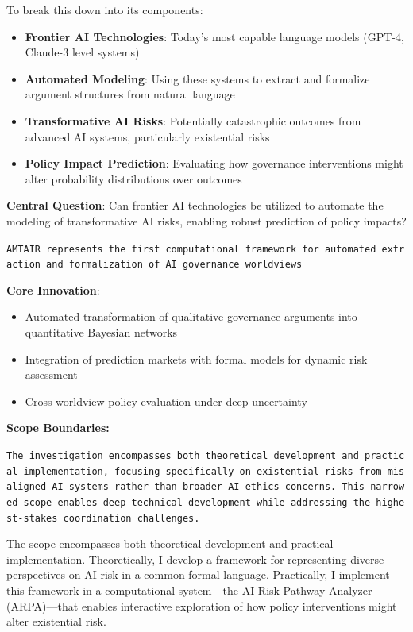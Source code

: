 \documentclass[]{book}
\providecommand{\tightlist}{%
  \setlength{\itemsep}{0pt}\setlength{\parskip}{0pt}}
\begin{document}
To break this down into its components:

\begin{itemize}
\tightlist
\item
  \textbf{Frontier AI Technologies}: Today's most capable language
  models (GPT-4, Claude-3 level systems)
\item
  \textbf{Automated Modeling}: Using these systems to extract and
  formalize argument structures from natural language
\item
  \textbf{Transformative AI Risks}: Potentially catastrophic outcomes
  from advanced AI systems, particularly existential risks
\item
  \textbf{Policy Impact Prediction}: Evaluating how governance
  interventions might alter probability distributions over outcomes
\end{itemize}

\textbf{Central Question}: Can frontier AI technologies be utilized to
automate the modeling of transformative AI risks, enabling robust
prediction of policy impacts?

\texttt{AMTAIR\ represents\ the\ first\ computational\ framework\ for\ automated\ extraction\ and\ formalization\ of\ AI\ governance\ worldviews}

\textbf{Core Innovation}:

\begin{itemize}
\tightlist
\item
  Automated transformation of qualitative governance arguments into
  quantitative Bayesian networks
\item
  Integration of prediction markets with formal models for dynamic risk
  assessment
\item
  Cross-worldview policy evaluation under deep uncertainty
\end{itemize}

\textbf{Scope Boundaries:}

\texttt{The\ investigation\ encompasses\ both\ theoretical\ development\ and\ practical\ implementation,\ focusing\ specifically\ on\ existential\ risks\ from\ misaligned\ AI\ systems\ rather\ than\ broader\ AI\ ethics\ concerns.\ This\ narrowed\ scope\ enables\ deep\ technical\ development\ while\ addressing\ the\ highest-stakes\ coordination\ challenges.}

The scope encompasses both theoretical development and practical
implementation. Theoretically, I develop a framework for representing
diverse perspectives on AI risk in a common formal language.
Practically, I implement this framework in a computational system---the
AI Risk Pathway Analyzer (ARPA)---that enables interactive exploration
of how policy interventions might alter existential risk.
\end{document}
